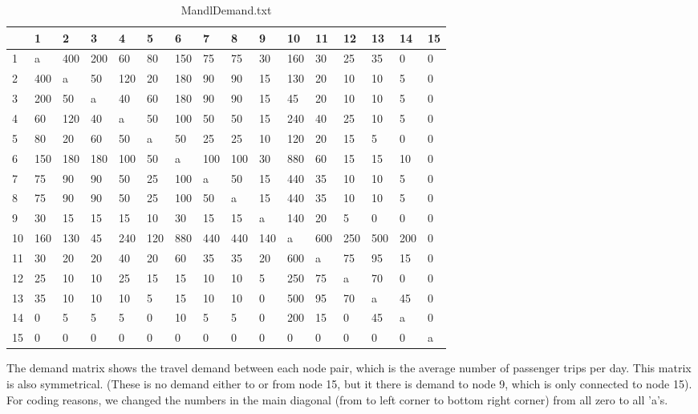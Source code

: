 \begin{table}[H]
\resizebox{12.5cm}{!} {
 

    \begin{tabular}{|l|lllllllllllllll|}
    \hline
    ~ & 1       & 2        &  3    &   4     &  5     &  6      & 7      &  8     & 9      & 10      & 11     & 12         &  13     & 14       &  15  \\
    \hline
    1 & a   & 400 & 200 & 60  & 80  & 150 & 75  & 75  & 30  & 160 & 30  & 25  & 35  & 0   & 0 \\
    2 & 400 & a   & 50  & 120 & 20  & 180 & 90  & 90  & 15  & 130 & 20  & 10  & 10  & 5   & 0 \\
    3 & 200 & 50  & a   & 40  & 60  & 180 & 90  & 90  & 15  & 45  & 20  & 10  & 10  & 5   & 0 \\
    4 & 60  & 120 & 40  & a   & 50  & 100 & 50  & 50  & 15  & 240 & 40  & 25  & 10  & 5   & 0 \\
    5 & 80  & 20  & 60  & 50  & a   & 50  & 25  & 25  & 10  & 120 & 20  & 15  & 5   & 0   & 0 \\
    6 & 150 & 180 & 180 & 100 & 50  & a   & 100 & 100 & 30  & 880 & 60  & 15  & 15  & 10  & 0 \\
    7 & 75  & 90  & 90  & 50  & 25  & 100 & a   & 50  & 15  & 440 & 35  & 10  & 10  & 5   & 0 \\
    8 & 75  & 90  & 90  & 50  & 25  & 100 & 50  & a   & 15  & 440 & 35  & 10  & 10  & 5   & 0 \\
    9 & 30  & 15  & 15  & 15  & 10  & 30  & 15  & 15  & a   & 140 & 20  & 5   & 0   & 0   & 0 \\
    10 & 160 & 130 & 45  & 240 & 120 & 880 & 440 & 440 & 140 & a   & 600 & 250 & 500 & 200 & 0 \\
    11 & 30  & 20  & 20  & 40  & 20  & 60  & 35  & 35  & 20  & 600 & a   & 75  & 95  & 15  & 0 \\
    12 & 25  & 10  & 10  & 25  & 15  & 15  & 10  & 10  & 5   & 250 & 75  & a   & 70  & 0   & 0 \\
    13 & 35  & 10  & 10  & 10  & 5   & 15  & 10  & 10  & 0   & 500 & 95  & 70  & a   & 45  & 0 \\
    14 & 0   & 5   & 5   & 5   & 0   & 10  & 5   & 5   & 0   & 200 & 15  & 0   & 45  & a   & 0 \\
    15 & 0   & 0   & 0   & 0   & 0   & 0   & 0   & 0   & 0   & 0   & 0   & 0   & 0   & 0   & a \\ 
    \hline
    \end{tabular}
    }
 	\caption {MandlDemand.txt}
 	\label{table:MandlDemand}
 	The demand matrix shows the travel demand between each node pair, which is the average number of passenger trips per day. This matrix is also symmetrical. (These is no demand either to or from node 15, but it there is demand to node 9, which is only connected to node 15). For coding reasons, we changed the numbers in the main diagonal (from to left corner to bottom right corner) from all zero to all ’a’s.

\end{table}

